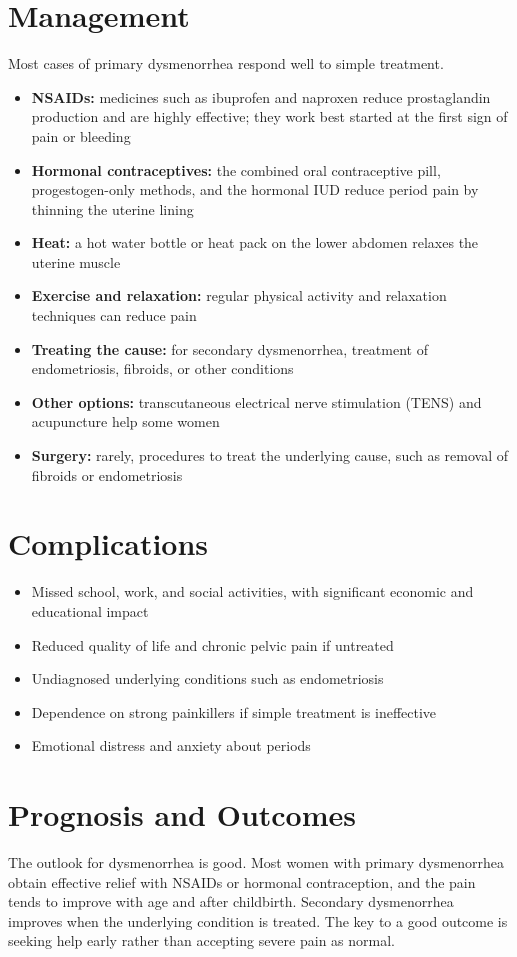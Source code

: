 \section*{Management}
Most cases of primary dysmenorrhea respond well to simple treatment.
\begin{itemize}
    \item \textbf{NSAIDs:} medicines such as ibuprofen and naproxen reduce prostaglandin production and are highly effective; they work best started at the first sign of pain or bleeding
    \item \textbf{Hormonal contraceptives:} the combined oral contraceptive pill, progestogen-only methods, and the hormonal IUD reduce period pain by thinning the uterine lining
    \item \textbf{Heat:} a hot water bottle or heat pack on the lower abdomen relaxes the uterine muscle
    \item \textbf{Exercise and relaxation:} regular physical activity and relaxation techniques can reduce pain
    \item \textbf{Treating the cause:} for secondary dysmenorrhea, treatment of endometriosis, fibroids, or other conditions
    \item \textbf{Other options:} transcutaneous electrical nerve stimulation (TENS) and acupuncture help some women
    \item \textbf{Surgery:} rarely, procedures to treat the underlying cause, such as removal of fibroids or endometriosis
\end{itemize}

\section*{Complications}
\begin{itemize}
    \item Missed school, work, and social activities, with significant economic and educational impact
    \item Reduced quality of life and chronic pelvic pain if untreated
    \item Undiagnosed underlying conditions such as endometriosis
    \item Dependence on strong painkillers if simple treatment is ineffective
    \item Emotional distress and anxiety about periods
\end{itemize}

\section*{Prognosis and Outcomes}
The outlook for dysmenorrhea is good. Most women with primary dysmenorrhea obtain effective relief with NSAIDs or hormonal contraception, and the pain tends to improve with age and after childbirth. Secondary dysmenorrhea improves when the underlying condition is treated. The key to a good outcome is seeking help early rather than accepting severe pain as normal.


